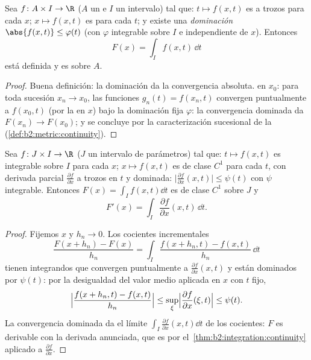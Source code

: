 \begin{theorem}\label{thm:b2:integration:continuity}
Sea $f \colon A \times I \to \R$ ($A$ un  e $I$ un
intervalo) tal que: $t \mapsto f(x, t)$ es  a trozos para
cada $x$; $x \mapsto f(x, t)$ es  para cada $t$; y existe una
\emph{dominación} $\abs{f(x,t)} \leq \varphi(t)$ (con $\varphi$
integrable sobre $I$ e independiente de $x$). Entonces
\[
F(x) = \int_I f(x, t)\,\dd t
\]
está definida y es  sobre $A$.
\end{theorem}

\begin{proof}
Buena definición: la dominación da la convergencia absoluta.
 en $x_0$: para toda sucesión $x_n \to x_0$, las
funciones $g_n(t) = f(x_n, t)$ convergen puntualmente a $f(x_0, t)$
(por la  en $x$) bajo la dominación fija $\varphi$: la
convergencia dominada da $F(x_n) \to F(x_0)$; y se concluye por la
caracterización sucesional de la 
(\cref{def:b2:metric:continuity}).
\end{proof}

\begin{theorem}\label{thm:b2:integration:leibnizrule}
Sea $f \colon J \times I \to \R$ ($J$ un intervalo de parámetros)
tal que: $t \mapsto f(x,t)$ es integrable sobre $I$ para cada $x$; $x
\mapsto f(x,t)$ es de clase $C^1$ para cada $t$, con derivada
parcial $\frac{\partial f}{\partial x}$  a trozos en $t$ y
dominada: $\bigl|\frac{\partial f}{\partial x}(x,t)\bigr| \leq
\psi(t)$ con $\psi$ integrable. Entonces $F(x) = \int_I f(x,t)\dd t$
es de clase $C^1$ sobre $J$ y
\[
F'(x) = \int_I \frac{\partial f}{\partial x}(x, t)\,\dd t .
\]
\end{theorem}

\begin{proof}
Fijemos $x$ y $h_n \to 0$. Los cocientes incrementales
\[
\frac{F(x + h_n) - F(x)}{h_n}
= \int_I \frac{f(x + h_n, t) - f(x, t)}{h_n}\,\dd t
\]
tienen integrandos que convergen puntualmente a $\frac{\partial
f}{\partial x}(x, t)$ y están dominados por $\psi(t)$: por la
desigualdad del valor medio aplicada en $x$ con $t$ fijo,
\[
\Bigl|\frac{f(x + h_n, t) - f(x,t)}{h_n}\Bigr|
\leq \sup_{\xi} \Bigl|\frac{\partial f}{\partial x}(\xi, t)\Bigr|
\leq \psi(t) .
\]
La convergencia dominada da el límite $\int_I \frac{\partial
f}{\partial x}(x,t)\dd t$ de los cocientes: $F$ es derivable con la
derivada anunciada, que es  por el~\cref{thm:b2:integration:continuity} aplicado a $\frac{\partial
f}{\partial x}$.
\end{proof}

